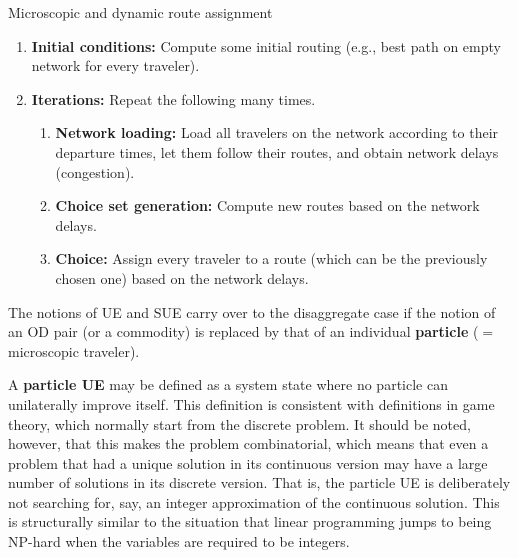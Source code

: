 \begin{algorithm}[H]
\label{dynamic-micro-routes}

\caption{Microscopic and dynamic route assignment}

\begin{enumerate}

\item \textbf{Initial conditions:} Compute some initial routing (e.g., best path on empty network
  for every traveler).

\item \textbf{Iterations:} Repeat the following many times.

\begin{enumerate}

\item \textbf{Network loading:} Load all travelers on the network
  according to their departure times, let them follow their
  routes, and obtain network delays (congestion).

\item \textbf{Choice set generation:} Compute new routes based on the
  network delays.

\item \textbf{Choice:} Assign every traveler to a route 
  (which can be the previously chosen one) based on the network delays.

\end{enumerate} %

\end{enumerate}

\end{algorithm}

The notions of UE and SUE carry over to the disaggregate case if the notion of an OD pair (or a commodity) is replaced by that of an individual \textbf{particle} ($=$ microscopic traveler).

A \textbf{particle UE} may be defined as a system state where no
particle can unilaterally improve itself. 
%
This definition is consistent with definitions in game theory, which
normally start from the discrete problem.
%
It should be noted, however, that this makes the problem
combinatorial, which means that even a problem that had a unique
solution in its continuous version may have a large number of
solutions in its discrete version.  That is, the particle UE is
deliberately not searching for, say, an integer approximation of the
continuous solution.
%
This is structurally similar to the situation that linear programming
jumps to being NP-hard when the variables are required to be
integers. 

